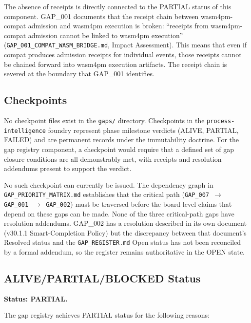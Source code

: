 The absence of receipts is directly connected to the PARTIAL status of this component.
GAP\_001 documents that the receipt chain between wasm4pm-compat admission and wasm4pm
execution is broken: ``receipts from wasm4pm-compat admission cannot be linked to wasm4pm
execution'' (\texttt{GAP\_001\_COMPAT\_WASM\_BRIDGE.md}, Impact Assessment). This means
that even if compat produces admission receipts for individual events, those receipts
cannot be chained forward into wasm4pm execution artifacts. The receipt chain is severed
at the boundary that GAP\_001 identifies.

\subsection{Checkpoints}
\label{sec:gaps-evidence-checkpoints}

No checkpoint files exist in the \texttt{gaps/} directory. Checkpoints in the
\texttt{process-intelligence} foundry represent phase milestone verdicts (ALIVE, PARTIAL,
FAILED) and are permanent records under the immutability doctrine. For the gap registry
component, a checkpoint would require that a defined set of gap closure conditions are
all demonstrably met, with receipts and resolution addendums present to support the
verdict.

No such checkpoint can currently be issued. The dependency graph in
\texttt{GAP\_PRIORITY\_MATRIX.md} establishes that the critical path
(\texttt{GAP\_007 $\rightarrow$ GAP\_001 $\rightarrow$ GAP\_002}) must be traversed before
the board-level claims that depend on these gaps can be made. None of the three critical-path
gaps have resolution addendums. GAP\_002 has a resolution described in its own document
(v30.1.1 Smart-Completion Policy) but the discrepancy between that document's Resolved
status and the \texttt{GAP\_REGISTER.md} Open status has not been reconciled by a
formal addendum, so the register remains authoritative in the OPEN state.

\subsection{ALIVE/PARTIAL/BLOCKED Status}
\label{sec:gaps-evidence-status}

\textbf{Status: PARTIAL.}

The gap registry achieves PARTIAL status for the following reasons:

